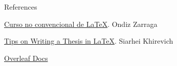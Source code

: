 \begin{frame}{References}
 \begin{fullpageitemize}
	\itemR\href{https://ondiz.github.io/cursoLatex/}{Curso no convencional de LaTeX}. Ondiz Zarraga

	\itemR \href{http://www.khirevich.com/latex/}{Tips on Writing a Thesis in LaTeX}. Siarhei Khirevich
	
	\itemR \href{https://www.overleaf.com/learn/latex/Main_Page}{Overleaf Docs}
 \end{fullpageitemize}
 
\end{frame}


